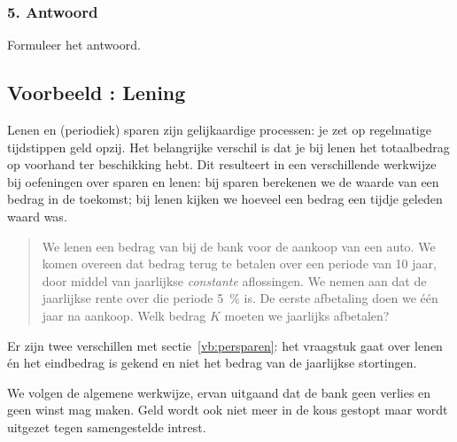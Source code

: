 \subsubsection{5. Antwoord}
Formuleer het antwoord.


\subsection{Voorbeeld : Lening}
Lenen en (periodiek) sparen zijn  gelijkaardige processen: je zet op regelmatige tijdstippen geld opzij. Het belangrijke verschil is dat je bij lenen het totaalbedrag op voorhand ter beschikking hebt. Dit resulteert in een verschillende werkwijze bij oefeningen over sparen en lenen: bij sparen berekenen we de waarde van een bedrag in de toekomst; bij lenen kijken we hoeveel een bedrag een tijdje geleden waard was. 
\begin{quote}
    We lenen een bedrag van  bij de bank voor de aankoop
    van een auto. We komen overeen dat bedrag terug te betalen over
    een periode van 10 jaar, door middel van jaarlijkse \emph{constante}
    aflossingen. We nemen aan dat de jaarlijkse rente over die periode \SI{5}{\percent} is.
    De eerste afbetaling doen we \'{e}\'{e}n jaar na aankoop. Welk
    bedrag $K$ moeten we jaarlijks afbetalen?
\end{quote}
Er zijn twee verschillen met  sectie~\ref{vb:persparen}: het vraagstuk gaat over lenen \'en het eindbedrag is gekend en niet het bedrag van de jaarlijkse stortingen.

We volgen de algemene werkwijze, ervan uitgaand dat de bank
geen verlies en geen winst mag maken. Geld wordt ook niet meer in
de kous gestopt maar wordt uitgezet tegen samengestelde intrest.

